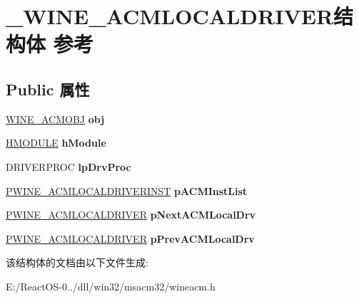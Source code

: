 \hypertarget{struct___w_i_n_e___a_c_m_l_o_c_a_l_d_r_i_v_e_r}{}\section{\+\_\+\+W\+I\+N\+E\+\_\+\+A\+C\+M\+L\+O\+C\+A\+L\+D\+R\+I\+V\+E\+R结构体 参考}
\label{struct___w_i_n_e___a_c_m_l_o_c_a_l_d_r_i_v_e_r}
\subsection*{Public 属性}
\begin{DoxyCompactItemize}
\item 
\mbox{\label{struct___w_i_n_e___a_c_m_l_o_c_a_l_d_r_i_v_e_r_acddb4c2c5ecf7ea47c54b1b38aab192a}} 
\hyperlink{struct___w_i_n_e___a_c_m_o_b_j}{W\+I\+N\+E\+\_\+\+A\+C\+M\+O\+BJ} {\bfseries obj}
\item 
\mbox{\label{struct___w_i_n_e___a_c_m_l_o_c_a_l_d_r_i_v_e_r_a07267a9a26c25ae635d32ce070c434ae}} 
\hyperlink{interfacevoid}{H\+M\+O\+D\+U\+LE} {\bfseries h\+Module}
\item 
\mbox{\label{struct___w_i_n_e___a_c_m_l_o_c_a_l_d_r_i_v_e_r_a0093ec92b21093d006ea2569ca196231}} 
D\+R\+I\+V\+E\+R\+P\+R\+OC {\bfseries lp\+Drv\+Proc}
\item 
\mbox{\label{struct___w_i_n_e___a_c_m_l_o_c_a_l_d_r_i_v_e_r_aa1d3b67e9a1ab81b188f290bd72a5b27}} 
\hyperlink{struct___w_i_n_e___a_c_m_l_o_c_a_l_d_r_i_v_e_r_i_n_s_t}{P\+W\+I\+N\+E\+\_\+\+A\+C\+M\+L\+O\+C\+A\+L\+D\+R\+I\+V\+E\+R\+I\+N\+ST} {\bfseries p\+A\+C\+M\+Inst\+List}
\item 
\mbox{\label{struct___w_i_n_e___a_c_m_l_o_c_a_l_d_r_i_v_e_r_accc70b2efad79b1daa2287ed9114011b}} 
\hyperlink{struct___w_i_n_e___a_c_m_l_o_c_a_l_d_r_i_v_e_r}{P\+W\+I\+N\+E\+\_\+\+A\+C\+M\+L\+O\+C\+A\+L\+D\+R\+I\+V\+ER} {\bfseries p\+Next\+A\+C\+M\+Local\+Drv}
\item 
\mbox{\label{struct___w_i_n_e___a_c_m_l_o_c_a_l_d_r_i_v_e_r_a2efd1df5040b6958c799b2bf2ed01cf6}} 
\hyperlink{struct___w_i_n_e___a_c_m_l_o_c_a_l_d_r_i_v_e_r}{P\+W\+I\+N\+E\+\_\+\+A\+C\+M\+L\+O\+C\+A\+L\+D\+R\+I\+V\+ER} {\bfseries p\+Prev\+A\+C\+M\+Local\+Drv}
\end{DoxyCompactItemize}


该结构体的文档由以下文件生成\+:\begin{DoxyCompactItemize}
\item 
E\+:/\+React\+O\+S-\/0../dll/win32/msacm32/wineacm.\+h\end{DoxyCompactItemize}

